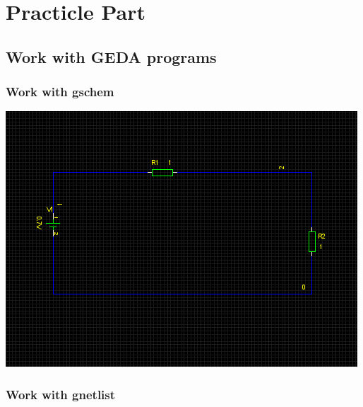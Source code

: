 \documentclass{report}
\begin{document}
\newpage
\chapter{Practicle Part}
\section{Work with GEDA programs}
\subsection{Work with gschem}
\includegraphics[]{schematics.png}
\subsection{Work with gnetlist}

\clearpage
\newpage
\end{document}
